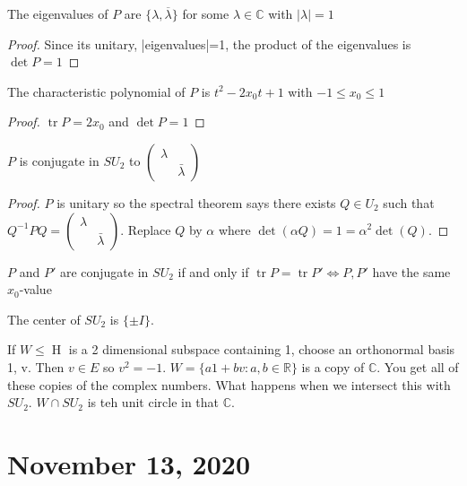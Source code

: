 \documentclass{article}
\newcommand{\C}{\mathbb{C}}
\newcommand{\R}{\mathbb{R}}
\newcommand{\HH}{{\operatorname{H}}}
\DeclareMathOperator{\tr}{tr}
\begin{document}
\begin{fact}
The eigenvalues of $P$ are $\{\lambda,\overline{\lambda}\}$ for some $\lambda\in\C$ with $|\lambda|=1$
\end{fact}
\begin{proof}
Since its unitary, |eigenvalues|=1, the product of the eigenvalues is $\det P=1$
\end{proof}
\begin{fact}
The characteristic polynomial of $P$ is $t^2-2x_0t+1$ with $-1\leq x_0\leq 1$
\end{fact}
\begin{proof}
$\tr P=2x_0$ and $\det P=1$
\end{proof}
\begin{fact}
$P$ is conjugate in $SU_2$ to $\begin{pmatrix}
\lambda&\\&\bar{\lambda}
\end{pmatrix}$
\end{fact}
\begin{proof}
$P$ is unitary so the spectral theorem says there exists $Q\in U_2$ such that $Q^{-1}PQ=\begin{pmatrix}
\lambda&\\&\bar{\lambda}
\end{pmatrix}$. Replace $Q$ by $\alpha$ where $\det(\alpha Q)=1=\alpha^2\det(Q)$.
\end{proof}
\begin{fact}
$P$ and $P'$ are conjugate in $SU_2$ if and only if $\tr P=\tr P'\iff P,P' $ have the same $x_0$-value
\end{fact}
The center of $SU_2$ is $\{\pm I\}$.

If $W\leq \HH$ is a 2 dimensional subspace containing 1,  choose an orthonormal basis 1, v. Then $v\in E$ so $v^2=-1$. $W=\{a1+bv:a,b\in\R\}$ is a copy of $\C$. You get all of these copies of the complex numbers. What happens when we intersect this with $SU_2$. $W\cap SU_2$ is teh unit circle in that $\C$.

\section{November 13, 2020}
\end{document}
